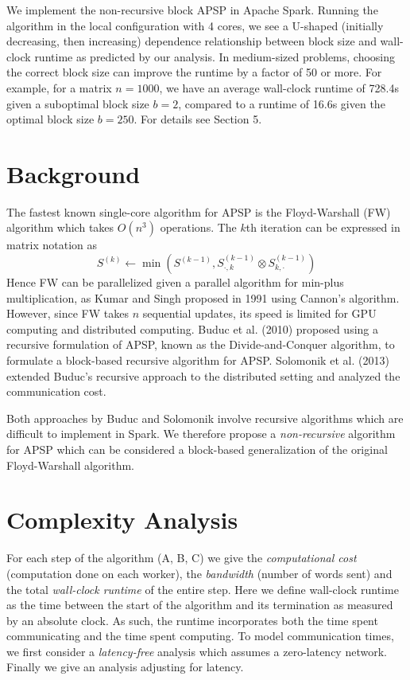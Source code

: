 \documentclass{article} %
\begin{document}
We implement the non-recursive block APSP in Apache Spark.
Running the algorithm in the local configuration with 4 cores, we see a U-shaped (initially decreasing, then increasing) dependence relationship between block size and wall-clock runtime as predicted by our analysis.
In medium-sized problems, choosing the correct block size can improve the runtime by a factor of 50 or more.
For example, for a matrix $n = 1000$, we have an average wall-clock runtime of 728.4s given a suboptimal block size $b = 2$, compared to a runtime of 16.6s given the optimal block size $b = 250$.
For details see Section 5.

\section{Background}

The fastest known single-core algorithm for APSP is the Floyd-Warshall (FW)
algorithm which takes $O(n^3)$ operations.  The $k$th iteration can be
expressed in matrix notation as
\[
S^{(k)} \leftarrow \min(S^{(k-1)}, S^{(k-1)}_{\cdot, k} \otimes S^{(k-1)}_{k, \cdot})
\]
Hence FW can be parallelized given a parallel algorithm for min-plus
multiplication, as Kumar and Singh proposed in 1991 using Cannon's
algorithm.  However, since FW takes $n$ sequential updates, its speed
is limited for GPU computing and distributed computing.  Buduc et
al. (2010) proposed using a recursive formulation of APSP, known as
the Divide-and-Conquer algorithm, to formulate a block-based recursive
algorithm for APSP.  Solomonik et al. (2013) extended Buduc's
recursive approach to the distributed setting and analyzed the
communication cost.

Both approaches by Buduc and Solomonik involve recursive algorithms
which are difficult to implement in Spark.  We therefore propose a
\emph{non-recursive} algorithm for APSP which can be considered a
block-based generalization of the original Floyd-Warshall algorithm.

\section{Complexity Analysis}

For each step of the algorithm (A, B, C) we give the \emph{computational cost} (computation done
on each worker), the \emph{bandwidth} (number of words sent) and the
total \emph{wall-clock runtime} of the entire step.  Here we define wall-clock runtime as
the time between the start of the algorithm and its termination as
measured by an absolute clock. As such, the runtime incorporates both
the time spent communicating and the time spent computing.  To model
communication times, we first consider a \emph{latency-free} analysis
which assumes a zero-latency network.  Finally we give an analysis
adjusting for latency.
\end{document}
